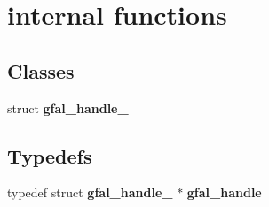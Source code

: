 \section{internal functions}
\label{group__internal__group}
\subsection*{Classes}
\begin{DoxyCompactItemize}
\item 
struct {\bf gfal\_\-handle\_\-}
\end{DoxyCompactItemize}
\subsection*{Typedefs}
\begin{DoxyCompactItemize}
\item 
typedef struct {\bf gfal\_\-handle\_\-} $\ast$ {\bfseries gfal\_\-handle}\label{group__internal__group_gadf5d912799491a2846cc51094fa108cb}

\end{DoxyCompactItemize}
